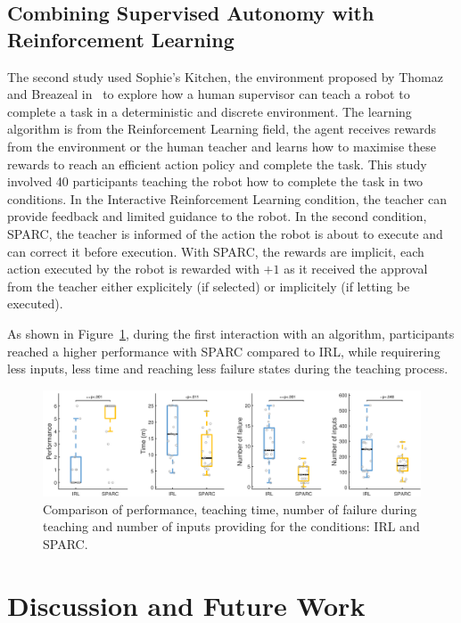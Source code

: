 \documentclass[conference]{IEEEtran}
\begin{document}
\subsection{Combining Supervised Autonomy with Reinforcement Learning}

The second study \cite{senft2017supervised} used Sophie's Kitchen, the
environment proposed by Thomaz and Breazeal in~\cite{thomaz2008teachable} to
explore how a human supervisor can teach a robot to complete a task in a
deterministic and discrete environment. The learning algorithm is from the
Reinforcement Learning field, the agent receives rewards from the environment or
the human teacher and learns how to maximise these rewards to reach an efficient
action policy and complete the task. This study involved 40 participants
teaching the robot how to complete the task in two conditions. In the
Interactive Reinforcement Learning condition, the teacher can provide feedback
and limited guidance to the robot. In the second condition, SPARC, the teacher
is informed of the action the robot is about to execute and can correct it
before execution. With SPARC, the rewards are implicit, each action executed by
the robot is rewarded with $+1$ as it received the approval from the teacher
either explicitely (if selected) or implicitely (if letting be executed). 

As shown in Figure~\ref{fig:film}, during the first interaction with an
algorithm, participants reached a higher performance with SPARC compared to IRL,
while requirering less inputs, less time and reaching less failure states during
the teaching process.

\begin{figure}
    \centering
    \includegraphics[width=0.99\linewidth]{film.pdf}
    \caption{Comparison of performance, teaching time, number of failure during
    teaching and number of inputs providing for the conditions: IRL and SPARC.}
    \label{fig:film}
\end{figure}

\section{Discussion and Future Work}
\end{document}
